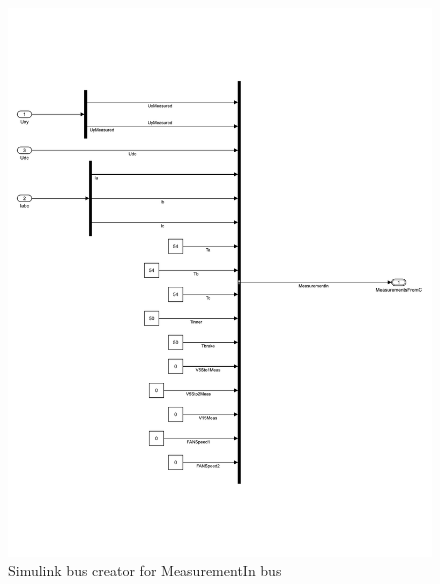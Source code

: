 \begin{figure}[!h]
\centering
\includegraphics[width=0.9\columnwidth]{figures/inputs}
\caption{Simulink bus creator for MeasurementIn bus}
\label{fig:fig_MeasurementIn}
\end{figure}

